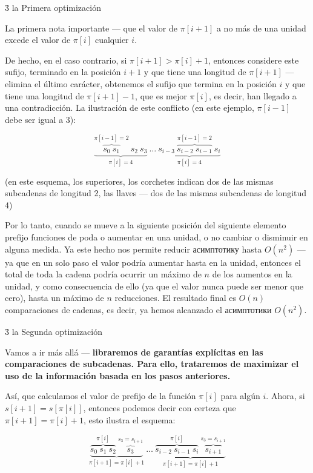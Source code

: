 \h3{ la Primera optimización }

La primera nota importante --- que el valor de $\pi[i+1]$ a no más de una unidad excede el valor de $\pi[i]$ cualquier $i$.

De hecho, en el caso contrario, si $\pi[i+1] > \pi[i] + 1$, entonces considere este sufijo, terminado en la posición $i+1$ y que tiene una longitud de $\pi[i+1]$ --- elimina el último carácter, obtenemos el sufijo que termina en la posición $i$ y que tiene una longitud de $\pi[i+1]-1$, que es mejor $\pi[i]$, es decir, han llegado a una contradicción. La ilustración de este conflicto (en este ejemplo, $\pi[i-1]$ debe ser igual a 3):

$$ \underbrace{ \overbrace{s_0 \ s_1}^{\pi[i-1]=2} \ s_2 \ s_3}_{\pi[i]=4} \ \ldots\ \underbrace{ s_{i-3}\ \overbrace{s_{i-2}\ s_{i-1}}^{\pi[i-1]=2} \ s_i}_{\pi[i]=4} $$

(en este esquema, los superiores, los corchetes indican dos de las mismas subcadenas de longitud 2, las llaves --- dos de las mismas subcadenas de longitud 4)

Por lo tanto, cuando se mueve a la siguiente posición del siguiente elemento prefijo funciones de poda o aumentar en una unidad, o no cambiar o disminuir en alguna medida. Ya este hecho nos permite reducir асимптотику hasta $O(n^2)$ --- ya que en un solo paso el valor podría aumentar hasta en la unidad, entonces el total de toda la cadena podría ocurrir un máximo de $n$ de los aumentos en la unidad, y como consecuencia de ello (ya que el valor nunca puede ser menor que cero), hasta un máximo de $n$ reducciones. El resultado final es $O(n)$ comparaciones de cadenas, es decir, ya hemos alcanzado el асимптотики $O(n^2)$.

\h3{ la Segunda optimización }

Vamos a ir más allá --- \bf{libraremos de garantías explícitas en las comparaciones de subcadenas}. Para ello, trataremos de maximizar el uso de la información basada en los pasos anteriores.

Así, que calculamos el valor de prefijo de la función $\pi[i]$ para algún $i$. Ahora, si $s[i+1] = s[\pi[i]]$, entonces podemos decir con certeza que $\pi[i+1] = \pi[i] + 1$, esto ilustra el esquema:

$$ \underbrace{ \overbrace{s_0 \ s_1 \ s_2}^{\pi[i]} \ \overbrace{s_3}^{s_3=s_{i+1}}}_{\pi[i+1]=\pi[i]+1} \ \ldots\ \underbrace{ \overbrace{s_{i-2}\ s_{i-1}\ s_i}^{\pi[i]} \ \overbrace{s_{i+1}}^{s_3=s_{i+1}}}_{\pi[i+1]=\pi[i]+1} $$

